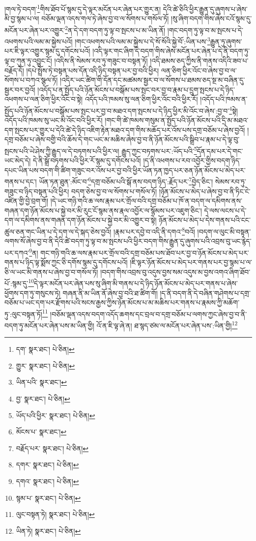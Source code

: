 །གལ་ཏེ་བདག་\footnote{དག་  སྣར་ཐང་།  པེ་ཅིན། }གིས་ཐོབ་པོ་སྙམ་དུ་དེ་ལྟར་མངོན་པར་ཞེན་པར་གྱུར་ན། དེའི་ཚེ་ཅིའི་ཕྱིར་རྒྱུན་དུ་ཞུགས་པ་ཞེས་མི་བྱ་སྙམ་པ་ལ། བཅོམ་ལྡན་འདས་གལ་ཏེ་ཞེས་བྱ་བ་ལ་སོགས་པ་གསོལ་ཏོ། །སུ་ཞིག་བདག་གིས་ཞེས་ངའོ་སྙམ་དུ་མངོན་པར་ཞེན་པར་འགྱུར་\footnote{གྱུར་  སྣར་ཐང་།  པེ་ཅིན། }ན་དེ་དག་བདག་ཏུ་ལྟ་བ་སྤངས་པ་མ་ཡིན་ནོ། །གང་བདག་ཏུ་ལྟ་བ་མ་སྤངས་པ་དེ་འཕགས་པའི་ལམ་མ་སྐྱེས་པའོ། །གང་འཕགས་པའི་ལམ་མ་སྐྱེས་པ་དེ་སོ་སོའི་སྐྱེ་བོ་:ཡིན་པས་\footnote{ཡིན་པའི་  སྣར་ཐང་། }རྒྱུན་ཏུ་ཞུགས་པར་ཇི་ལྟར་འགྱུར་སྙམ་དུ་དགོངས་པའོ། །འདི་ལྟར་གང་ཞིག་དེ་བདག་གིས་ཞེས་མངོན་པར་ཞེན་པ་དེ་ནི་བདག་ཏུ་ལྟ་བ་ཀུན་ཏུ་འབྱུང་ངོ། །འདིས་ནི་སེམས་རབ་ཏུ་གཟུང་བ་བསྟན་ཏོ། །འདི་ཐམས་ཅད་ཀྱིས་ནི་གནས་འདིའི་ཟབ་པ་བརྗོད་དོ། །དཔེ་སྤྲོས་ཏེ་བསྟན་པས་དོན་འདི་ཉིད་བསྟན་པར་བྱ་བའི་ཕྱིར། ལན་ཅིག་ཕྱིར་འོང་བ་ཞེས་བྱ་བ་ལ་སོགས་པ་བཀའ་སྩལ་ཏོ། །འདིར་ཡང་ཚིག་གི་དོན་དང་མཚམས་སྦྱར་བ་ལ་སོགས་པ་ཐམས་ཅད་སྔ་མ་བཞིན་དུ་སྦྱར་བར་བྱའོ། །འདོད་པ་ན་སྤྱོད་པའི་ཉོན་མོངས་པ་བསྒོམ་པས་སྤང་བར་བྱ་བ་རྣམ་པ་དྲུག་སྤངས་པ་དེ་ཉིད་འཕགས་པ་ལན་ཅིག་ཕྱིར་འོང་བ་སྟེ། འདོད་པའི་ཁམས་སུ་ལན་ཅིག་ཕྱིར་འོང་བའི་ཕྱིར་རོ། །འདོད་པའི་ཁམས་ན་སྤྱོད་པའི་ཉོན་མོངས་པ་བསྒོམ་པས་སྤང་པར་བྱ་བ་མཐའ་དག་སྤངས་པ་དེ་ཉིད་ཕྱིར་མི་འོང་བ་ཞེས་:བྱ་བ་\footnote{བྱ་  སྣར་ཐང་།  པེ་ཅིན། }སྟེ། འདོད་པའི་ཁམས་སུ་ཡང་མི་འོང་བའི་ཕྱིར་རོ། །གང་གི་ཚེ་ཁམས་གསུམ་ན་སྤྱོད་པའི་ཉོན་མོངས་པའི་དྲི་མ་མཐའ་དག་སྤངས་པར་གྱུར་པ་དེའི་ཚེ་དེ་ཉིད་འཇིག་རྟེན་མཐའ་དག་གིས་མཆོད་པར་འོས་པས་དགྲ་བཅོམ་པ་ཞེས་བྱའོ། །དགྲ་བཅོམ་པ་ཞེས་བགྱི་བའི་ཆོས་དེ་གང་ཡང་མ་མཆིས་ཞེས་བྱ་བ་ནི་ཉོན་མོངས་པའི་སྒྲིབ་པ་རྣམ་པ་དེ་ལྟ་བུ་སྤངས་པའི་ཡེ་ཤེས་ཀྱི་རྒྱུད་ལ་དེ་བཏགས་པའི་ཕྱིར་ལ། རྒྱུད་ཀྱང་བཏགས་པར་:ཡོད་པའི་\footnote{ཡོད་པའི་ཕྱིར་  སྣར་ཐང་།  པེ་ཅིན། }དོན་དམ་པར་དེ་གང་ཡང་མེད་དེ། དེ་ནི་སྒྲོ་བཏགས་པའི་ཕྱིར་རོ་སྙམ་དུ་དགོངས་པའོ། །ད་ནི་འཕགས་པ་རབ་འབྱོར་གྱིས་བདག་ཉིད་དཔང་ཡིན་པས་བདག་གི་ཚིག་གཟུང་བར་འོས་པར་བྱ་བའི་ཕྱིར་ཡོན་ཏན་ཁྱད་པར་ཅན་ཉོན་མོངས་པ་མེད་པར་གནས་པ་དང་། ཡོན་ཏན་ཐུན་:མོང་བ་\footnote{མོངས་པ་  སྣར་ཐང་། }དགྲ་བཅོམ་པའི་སྒོ་ནས་བདག་ཉིད་:རྗོད་པར་\footnote{བརྗོད་པར་  སྣར་ཐང་།  པེ་ཅིན། }བྱེད་ཅིང་། སེམས་རབ་ཏུ་གཟུང་བ་ཉིད་བསྟན་པའི་ཕྱིར། བདག་ཅེས་བྱ་བ་ལ་སོགས་པ་གསོལ་ཏོ། །ཉོན་མོངས་པ་མེད་པ་ཞེས་བྱ་བ་ནི་ཏིང་ངེ་འཛིན་གྱི་བྱེ་བྲག་གོ། །དེ་ཡང་གཉི་གའི་ཆ་ལས་རྣམ་པར་གྲོལ་བའི་དགྲ་བཅོམ་པ་ཁོ་ན་བདག་ལ་དམིགས་ནས་གཞན་དག་ཉོན་མོངས་པ་སྐྱེ་བར་མི་རུང་ངོ་སྙམ་ནས་རྣལ་འབྱོར་ལ་སྙོམས་པར་འཇུག་ཅིང་། དེ་ལས་ལངས་པ་དེ་དག་ལ་དམིགས་ནས་གཞན་དག་ཉོན་མོངས་པ་སྐྱེ་བར་མི་འགྱུར་བ་སྟེ། ཉོན་མོངས་པ་མེད་པ་དེས་གནས་པའི་ངང་ཚུལ་ཅན་གང་ཡིན་པ་དེ་དག་ལ་དེ་སྐད་ཅེས་བྱའོ། །རྣམ་པར་དབྱེ་བ་འདི་ནི་དགའ་\footnote{དགར་  སྣར་ཐང་།  པེ་ཅིན། }བའོ། །བདག་ལ་ལུང་མི་བསྟན་ལགས་སོ་ཞེས་བྱ་བ་ནི་དེའི་ཚེ་བདག་ཏུ་ལྟ་བ་མ་སྤངས་པའི་ཕྱིར་བདག་གིས་རྒྱུན་དུ་ཞུགས་པའི་འབྲས་བུ་ཡང་རྙེད་པར་དཀའ་\footnote{དགའ་  སྣར་ཐང་།  པེ་ཅིན། }ན། གང་གཉི་གའི་ཆ་ལས་རྣམ་པར་གྲོལ་བའི་དགྲ་བཅོམ་པས་ཐོབ་པར་བྱ་བ་ཉོན་མོངས་པ་མེད་པར་གནས་པ་ཉིད་ལྟ་སྨོས་ཀྱང་ཅི་དགོས་སྙམ་དུ་དགོངས་པའོ། །ཇི་ལྟར་ཉོན་མོངས་པ་མེད་པར་གནས་པར་བྱ་སྙམ་པ་ལ་ཅི་ལ་ཡང་མི་གནས་པ་ཞེས་བྱ་བ་གསོལ་ཏོ། །བདག་གིས་འབྲས་བུ་འདུས་བྱས་སམ་འདུས་མ་བྱས་འགའ་ཞིག་ཐོབ་པོ་:སྙམ་དུ་\footnote{སྙམ་པ་  སྣར་ཐང་།  པེ་ཅིན། }དེ་ལྟར་མངོན་པར་ཞེན་པས་སུ་ཞིག་མི་གནས་པ་དེ་ཉིད་ཉོན་མོངས་པ་མེད་པར་གནས་པ་ཞེས་ཕྱོགས་དག་ཏུ་གསུངས་ཏེ། གཞན་ནི་མ་ཡིན་ནོ་ཞེས་བྱ་བའི་ཐ་ཚིག་གོ། །ད་ནི་བདག་ནི་དེ་བཞིན་གཤེགས་པ་དགྲ་བཅོམ་པ་ཡང་དག་པར་རྫོགས་པའི་སངས་རྒྱས་ཀྱིས་ཉོན་མོངས་པ་མ་མཆིས་པར་གནས་པ་རྣམས་ཀྱི་མཆོག་ཏུ་:ལུང་བསྟན་ཏོ།\footnote{ལུང་བསྟན་ཏེ།  སྣར་ཐང་།  པེ་ཅིན། } །བཅོམ་ལྡན་འདས་བདག་འདོད་ཆགས་དང་བྲལ་བ་དགྲ་བཅོམ་པ་ལགས་ཀྱང་ཞེས་བྱ་བ་ནི་བདག་ཏུ་མངོན་པར་ཞེན་པས་མ་ཡིན་གྱི། འོ་ན་ཇི་ལྟ་ཞེ་ན། ཐ་སྙད་ཙམ་ལ་མངོན་པར་ཞེན་པས་:ཡིན་གྱི།\footnote{ཡིན་ཏེ།  སྣར་ཐང་།  པེ་ཅིན། } 